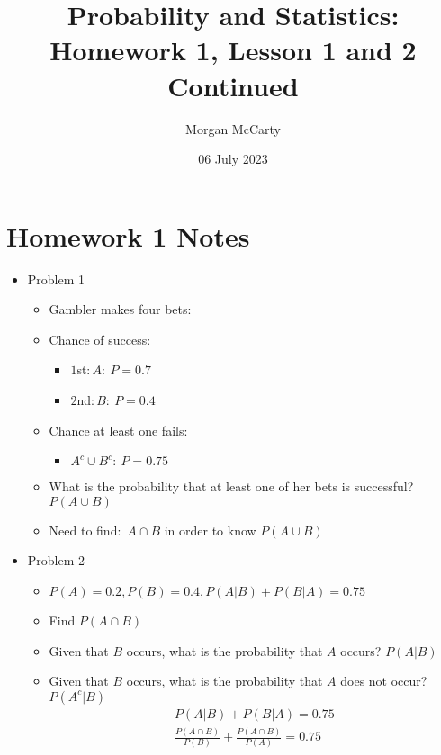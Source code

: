 \documentclass[12pt]{article}
\title{
    Probability and Statistics:\\
    Homework 1, Lesson 1 and 2 Continued}
\author{Morgan McCarty}
\date{06 July 2023}
\begin{document}
    \maketitle

    \section{Homework 1 Notes}
        \begin{itemize}
            \item Problem 1
            \begin{itemize}
                \item Gambler makes four bets:
                \item Chance of success:
                \begin{itemize}
                    \item $1$st$: A:\ P = 0.7$
                    \item $2$nd$: B:\ P = 0.4$
                \end{itemize}
                \item Chance at least one fails:
                \begin{itemize}
                    \item $A^c \cup B^c:\ P = 0.75$
                \end{itemize}
                \item What is the probability that at least one of her bets is successful? $P(A \cup B)$
                \item Need to find:\ $A \cap B$ in order to know $P(A \cup B)$
            \end{itemize}
            \item Problem 2
            \begin{itemize}
                \item $P(A) = 0.2, P(B) = 0.4, P(A|B) + P(B|A) = 0.75$
                \item Find $P(A \cap B)$
                \item Given that $B$ occurs, what is the probability that $A$ occurs? $P(A|B)$
                \item Given that $B$ occurs, what is the probability that $A$ does not occur? $P(A^c|B)$
                \begin{align*}
                    P(A|B) + P(B|A) = 0.75\\
                    \frac{P(A \cap B)}{P(B)} + \frac{P(A \cap B)}{P(A)} = 0.75\\

\end{align*}
\end{itemize}
\end{itemize}
\end{document}

